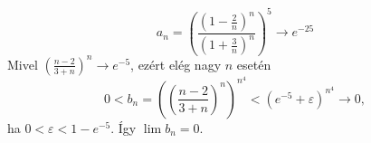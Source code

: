 \documentclass[11pt]{scrartcl}
\begin{document}
\[
	a_n
	= \left(
	\frac{\left(1 - \frac{2}{n}\right)^n}{\left(1 + \frac{3}{n}\right)^n}
	\right)^5
	\to e^{-25}
\]
Mivel
\(
\left( \frac{n - 2}{3 + n} \right)^n \to e^{-5}
\),
ezért elég nagy $n$ esetén
\[
	0 < b_n
	= \left( \left( \frac{n - 2}{3 + n} \right)^n \right)^{n^4}
	< \left( e^{-5} + \varepsilon \right)^{n^4}
	\to 0,
\]
ha $0 < \varepsilon < 1 - e^{-5}$. Így $\lim b_n = 0$.
\end{document}
